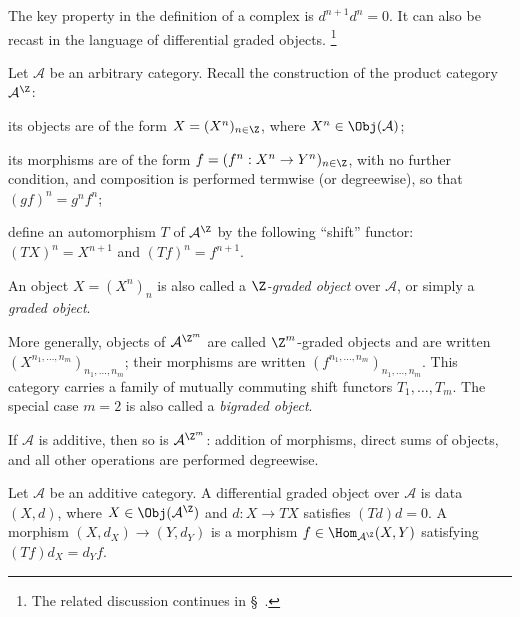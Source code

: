 The key property in the definition of a complex is $d^{n+1}d^n=0$. It can
also be recast in the language of differential graded objects.%
\footnote{The related discussion continues in
\S~.}

\begin{definition}\label{def:graded-obj}
	Let $\mathcal{A}$ be an arbitrary category. Recall the construction of the
	product category $\mathcal{A}^{\Z}$:
	\begin{compactitem}
		\item its objects are of the form $X=(X^n)_{n\in\Z}$, where
		$X^n\in\Obj(\mathcal{A})$;
		\item its morphisms are of the form
		$f=(f^n:X^n\to Y^n)_{n\in\Z}$, with no further condition, and
		composition is performed termwise (or degreewise), so that
		$(gf)^n=g^nf^n$;
		\item define an automorphism $T$ of $\mathcal{A}^{\Z}$ by the following
		``shift'' functor: $(TX)^n=X^{n+1}$ and $(Tf)^n=f^{n+1}$.
	\end{compactitem}
	An object $X=(X^n)_n$ is also called a \emph{$\Z$-graded object} over
	$\mathcal{A}$, or simply a \emph{graded object}.

	More generally, objects of $\mathcal{A}^{\Z^m}$ are called
	$\Z^m$-graded objects and are written
	$(X^{n_1,\ldots,n_m})_{n_1,\ldots,n_m}$; their morphisms are written
	$(f^{n_1,\ldots,n_m})_{n_1,\ldots,n_m}$. This category carries a family
	of mutually commuting shift functors $T_1,\ldots,T_m$. The special case
	$m=2$ is also called a \emph{bigraded object}.
\end{definition}

If $\mathcal{A}$ is additive, then so is $\mathcal{A}^{\Z^m}$: addition of
morphisms, direct sums of objects, and all other operations are performed
degreewise.

\begin{definition}
	Let $\mathcal{A}$ be an additive category. A differential graded object
	over $\mathcal{A}$ is data $(X,d)$, where
	$X\in\Obj(\mathcal{A}^{\Z})$ and $d:X\to TX$ satisfies $(Td)d=0$. A
	morphism $(X,d_X)\to(Y,d_Y)$ is a morphism
	$f\in\Hom_{\mathcal{A}^{\Z}}(X,Y)$ satisfying $(Tf)d_X=d_Yf$.
\end{definition}

